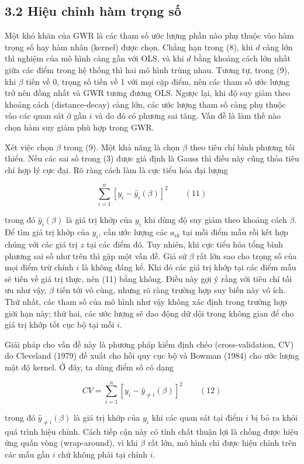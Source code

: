 \subsection{3.2 Hiệu chỉnh hàm trọng số}

Một khó khăn của GWR là các tham số ước lượng phần nào phụ thuộc vào hàm trọng số hay hàm nhân (kernel) được chọn. Chẳng hạn trong (8), khi \(d\) càng lớn thì nghiệm của mô hình càng gần với OLS, và khi \(d\) bằng khoảng cách lớn nhất giữa các điểm trong hệ thống thì hai mô hình trùng nhau. Tương tự, trong (9), khi \(\beta\) tiến về 0, trọng số tiến về 1 với mọi cặp điểm, nên các tham số ước lượng trở nên đồng nhất và GWR tương đương OLS. Ngược lại, khi độ suy giảm theo khoảng cách (distance-decay) càng lớn, các ước lượng tham số càng phụ thuộc vào các quan sát ở gần \(i\) và do đó có phương sai tăng. Vấn đề là làm thế nào chọn hàm suy giảm phù hợp trong GWR.

Xét việc chọn \(\beta\) trong (9). Một khả năng là chọn \(\beta\) theo tiêu chí bình phương tối thiểu. Nếu các sai số trong (3) được giả định là Gauss thì điều này cũng thỏa tiêu chí hợp lý cực đại. Rõ ràng cách làm là cực tiểu hóa đại lượng

\[\sum_{i=1}^{n} \left[y_i - \hat{y}_i(\beta)\right]^2 \qquad (11)\]

trong đó \(\hat{y}_i(\beta)\) là giá trị khớp của \(y_i\) khi dùng độ suy giảm theo khoảng cách \(\beta\). Để tìm giá trị khớp của \(y_i\), cần ước lượng các \(a_{ik}\) tại mỗi điểm mẫu rồi kết hợp chúng với các giá trị \(z\) tại các điểm đó. Tuy nhiên, khi cực tiểu hóa tổng bình phương sai số như trên thì gặp một vấn đề. Giả sử \(\beta\) rất lớn sao cho trọng số của mọi điểm trừ chính \(i\) là không đáng kể. Khi đó các giá trị khớp tại các điểm mẫu sẽ tiến về giá trị thực, nên (11) bằng không. Điều này gợi ý rằng với tiêu chí tối ưu như vậy, \(\beta\) tiến tới vô cùng, nhưng rõ ràng trường hợp suy biến này vô ích. Thứ nhất, các tham số của mô hình như vậy không xác định trong trường hợp giới hạn này; thứ hai, các ước lượng sẽ dao động dữ dội trong không gian để cho giá trị khớp tốt cục bộ tại mỗi \(i\).

Giải pháp cho vấn đề này là phương pháp kiểm định chéo (cross-validation, CV) do Cleveland (1979) đề xuất cho hồi quy cục bộ và Bowman (1984) cho ước lượng mật độ kernel. Ở đây, ta dùng điểm số có dạng

\[CV = \sum_{i=1}^{n} \left[y_i - \hat{y}_{\neq i}(\beta)\right]^2 \qquad (12)\]

trong đó \(\hat{y}_{\neq i}(\beta)\) là giá trị khớp của \(y_i\) khi các quan sát tại điểm \(i\) bị bỏ ra khỏi quá trình hiệu chỉnh. Cách tiếp cận này có tính chất thuận lợi là chống được hiệu ứng quấn vòng (wrap-around), vì khi \(\beta\) rất lớn, mô hình chỉ được hiệu chỉnh trên các mẫu gần \(i\) chứ không phải tại chính \(i\).


